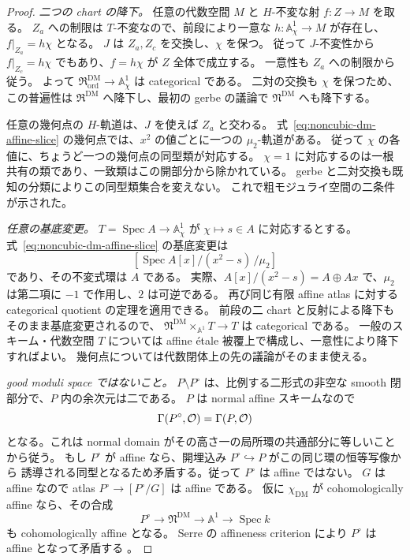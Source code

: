 \begin{proof}
\emph{二つの chart の降下。}
任意の代数空間 $M$ と $H$-不変な射 $f:Z\to M$ を取る。
$Z_a$ への制限は $T$-不変なので、前段により一意な
$h:\mathbb A^1_\chi\to M$ が存在し、$f|_{Z_a}=h\chi$ となる。
$J$ は $Z_a,Z_c$ を交換し、$\chi$ を保つ。
従って $J$-不変性から $f|_{Z_c}=h\chi$ でもあり、$f=h\chi$ が $Z$ 全体で成立する。
一意性も $Z_a$ への制限から従う。
よって $\mathfrak R_{\mathrm{ord}}^{\mathrm{DM}}\to\mathbb A^1_\chi$ は categorical である。
二対の交換も $\chi$ を保つため、この普遍性は
$\mathfrak R^{\mathrm{DM}}$ へ降下し、最初の gerbe の議論で
$\mathfrak N^{\mathrm{DM}}$ へも降下する。

任意の幾何点の $H$-軌道は、$J$ を使えば $Z_a$ と交わる。
式~\eqref{eq:noncubic-dm-affine-slice} の幾何点では、$x^2$ の値ごとに一つの $\mu_2$-軌道がある。
従って $\chi$ の各値に、ちょうど一つの幾何点の同型類が対応する。
$\chi=1$ に対応するのは一根共有の類であり、一致類はこの開部分から除かれている。
gerbe と二対交換も既知の分類によりこの同型類集合を変えない。
これで粗モジュライ空間の二条件が示された。

\emph{任意の基底変更。}
$T=\operatorname{Spec}A\to\mathbb A^1_\chi$ が $\chi\mapsto s\in A$ に対応するとする。
式~\eqref{eq:noncubic-dm-affine-slice} の基底変更は
\[
 [\operatorname{Spec}A[x]/(x^2-s)\,/\mu_2]
\]
であり、その不変式環は $A$ である。
実際、$A[x]/(x^2-s)=A\oplus Ax$ で、$\mu_2$ は第二項に $-1$ で作用し、$2$ は可逆である。
再び同じ有限 affine atlas に対する categorical quotient の定理を適用できる。
前段の二 chart と反射による降下もそのまま基底変更されるので、
$\mathfrak N^{\mathrm{DM}}\times_{\mathbb A^1}T\to T$ は categorical である。
一般のスキーム・代数空間 $T$ については affine étale 被覆上で構成し、一意性により降下すればよい。
幾何点については代数閉体上の先の議論がそのまま使える。

\emph{good moduli space ではないこと。}
$P\setminus P^\circ$ は、比例する二形式の非空な smooth 閉部分で、$P$ 内の余次元は二である。
$P$ は normal affine スキームなので
\[
 \Gamma(P^\circ,\mathcal O)=\Gamma(P,\mathcal O)
\]
となる。これは normal domain がその高さ一の局所環の共通部分に等しいことから従う。
もし $P^\circ$ が affine なら、開埋込み $P^\circ\hookrightarrow P$ がこの同じ環の恒等写像から
誘導される同型となるため矛盾する。従って $P^\circ$ は affine ではない。
$G$ は affine なので atlas $P^\circ\to[P^\circ/G]$ は affine である。
仮に $\chi_{\mathrm{DM}}$ が cohomologically affine なら、その合成
\[
 P^\circ\longrightarrow\mathfrak N^{\mathrm{DM}}
 \longrightarrow\mathbb A^1\longrightarrow\operatorname{Spec}k
\]
も cohomologically affine となる。
Serre の affineness criterion により $P^\circ$ は affine となって矛盾する
\cite[Propositions 3.3 and 3.9]{Alper2009}。


\end{proof}
